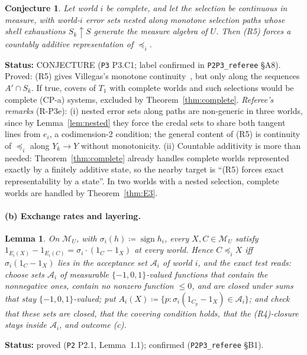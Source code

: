 \documentclass[11pt]{article}
\newtheorem{lemma}[theorem]{Lemma}
\newtheorem{conjecture}[theorem]{Conjecture}
\theoremstyle{definition}
\theoremstyle{remark}
\newcommand{\M}{\mathcal M}
\newcommand{\src}[1]{\texttt{#1}}
\newcommand{\status}[1]{\par\smallskip\noindent\textbf{Status:} #1\par\smallskip}
\begin{document}
\begin{conjecture}\label{conj:villegas}
Let world $i$ be complete, and let the selection be continuous in measure, with world-$i$ error sets nested along monotone selection paths whose shell exhaustions $S_k\uparrow S$ generate the measure algebra of $U$. Then (R5) forces a countably additive representation of $\preceq_i$.
\end{conjecture}
\status{CONJECTURE (\src{P3} P3.C1; label confirmed in \src{P2P3\_referee} \S A8). Proved: (R5) gives Villegas's monotone continuity~\cite{V1964}, but only along the sequences $A'\cap S_k$. If true, covers of $T_1$ with complete worlds and such selections would be complete (CP-a) systems, excluded by Theorem~\ref{thm:complete}. \emph{Referee's remarks} (R-P3e): (i) nested error sets along paths are non-generic in three worlds, since by Lemma~\ref{lem:nested} they force the credal sets to share both tangent lines from $e_i$, a codimension-2 condition; the general content of (R5) is continuity of $\preceq_i$ along $Y_k\to Y$ without monotonicity. (ii) Countable additivity is more than needed: Theorem~\ref{thm:complete} already handles complete worlds represented exactly by a finitely additive state, so the nearby target is ``(R5) forces exact representability by a state''. In two worlds with a nested selection, complete worlds are handled by Theorem~\ref{thm:E3}.}

\paragraph{(b) Exchange rates and layering.}

\begin{lemma}\label{lem:vectorform}
On $\M_U$, with $\sigma_i(h)\coloneqq\operatorname{sign}h_i$, every $X,C\in\M_U$ satisfy $1_{E_i(X)}-1_{E_i(C)}=\sigma_i\cdot(1_C-1_X)$ at every world. Hence $C\preceq_iX$ iff $\sigma_i(1_C-1_X)$ lies in the acceptance set $\mathcal A_i$ of world $i$, and the exact test reads: choose sets $\mathcal A_i$ of measurable $\{-1,0,1\}$-valued functions that contain the nonnegative ones, contain no nonzero function $\le0$, and are closed under sums that stay $\{-1,0,1\}$-valued; put $A_i(X)\coloneqq\{p:\sigma_i(1_{C_p}-1_X)\in\mathcal A_i\}$; and check that these sets are closed, that the covering condition holds, that the (R4)-closure stays inside $\mathcal A_i$, and outcome (c).
\end{lemma}
\status{proved (\src{P2} P2.1, Lemma~1.1); confirmed (\src{P2P3\_referee} \S B1).}
\end{document}
